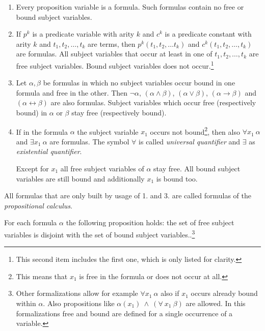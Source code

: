 \documentclass[a4paper,german,10pt,twoside]{book}
\theoremstyle{definition}
\theoremstyle{remark}
\begin{document}
\begin{enumerate}

\item Every proposition variable is a formula. Such formulas contain no free or bound subject variables.

\item If $p^k$ is a predicate variable with arity $k$ and $c^k$ is a predicate constant with arity $k$ and $t_1, t_2, \ldots, t_k$ are terms, then $p^k(t_1, t_2, \ldots t_k)$ and $c^k(t_1, t_2, \ldots, t_k)$ are formulas. All subject variables that occur at least in one of $t_1, t_2, \ldots, t_k$ are free subject variables. Bound subject variables does not occur.\footnote{This second item includes the first one, which is only listed for clarity.} 

\item Let $\alpha, \beta$ be formulas in which no subject variables occur bound in one formula and free in the other. Then $\neg \alpha$, $(\alpha \land \beta)$, $(\alpha \lor \beta)$, $(\alpha \rightarrow \beta)$ and $(\alpha \leftrightarrow \beta)$ are also formulas. Subject variables which occur free (respectively bound) in $\alpha$ or $\beta$ stay free (respectively bound).

\item If in the formula $\alpha$ the subject variable $x_1$ occurs not bound\footnote{This means that $x_1$ is free in the formula or does not occur at all.}, then also $\forall x_1~\alpha$ and $\exists x_1~\alpha$ are formulas. The symbol $\forall$ is called \emph{universal quantifier} and $\exists$ as
\emph{existential quantifier}.

Except for $x_1$ all free subject variables of $\alpha$ stay free. All bound subject variables are still bound and additionally $x_1$ is bound too.

\end{enumerate}

All formulas that are only built by usage of 1. and 3. are called formulas of the \emph{propositional calculus}.

\par
For each formula $\alpha$ the following proposition holds: the set of free subject variables is disjoint with the set of bound subject variables..\footnote{Other formalizations allow for example $\forall x_1~\alpha$ also if $x_1$ occurs already bound within $\alpha$. Also propositions like $\alpha(x_1)~\land~(\forall~x_1~\beta)$ are allowed. In this formalizations
free and bound are defined for a single occurrence of a variable.}
\end{document}
